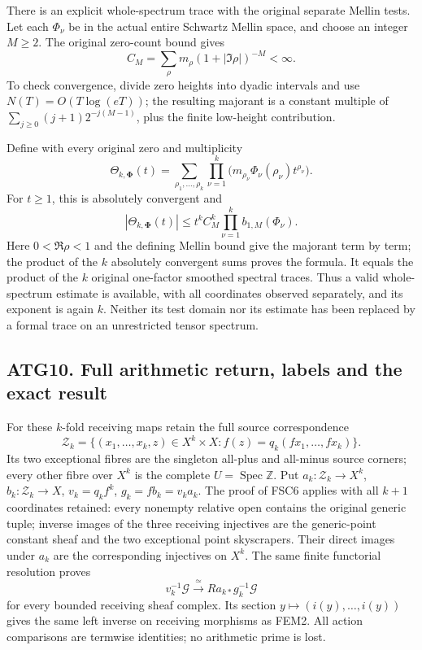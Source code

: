 There is an explicit whole-spectrum trace with the original separate
Mellin tests. Let each \(\Phi_\nu\) be in the actual entire Schwartz
Mellin space, and choose an integer \(M\ge2\). The original zero-count
bound gives \[
C_M=\sum_{\rho}m_\rho(1+|\Im\rho|)^{-M}<\infty.
\] To check convergence, divide zero heights into dyadic intervals and
use \(N(T)=O(T\log(eT))\); the resulting majorant is a constant multiple
of \(\sum_{j\ge0}(j+1)2^{-j(M-1)}\), plus the finite low-height
contribution.

Define with every original zero and multiplicity \[
\Theta_{k,\boldsymbol\Phi}(t)=
\sum_{\rho_1,\ldots,\rho_k}
 \prod_{\nu=1}^k
 \bigl(m_{\rho_\nu}\Phi_\nu(\rho_\nu)t^{\rho_\nu}\bigr).
\tag{ATG9.1}
\] For \(t\ge1\), this is absolutely convergent and \[
\boxed{|\Theta_{k,\boldsymbol\Phi}(t)|
 \le t^k C_M^k
 \prod_{\nu=1}^k b_{1,M}(\Phi_\nu).}
\tag{ATG9.2}
\] Here \(0<\Re\rho<1\) and the defining Mellin bound give the majorant
term by term; the product of the \(k\) absolutely convergent sums proves
the formula. It equals the product of the \(k\) original one-factor
smoothed spectral traces. Thus a valid whole-spectrum estimate is
available, with all coordinates observed separately, and its exponent is
again \(k\). Neither its test domain nor its estimate has been replaced
by a formal trace on an unrestricted tensor spectrum.

\subsection{ATG10. Full arithmetic return, labels and the exact
result}\label{atg10.-full-arithmetic-return-labels-and-the-exact-result}

For these \(k\)-fold receiving maps retain the full source
correspondence \[
\mathcal Z_k=
\{(x_1,\ldots,x_k,z)\in X^k\times X:
 f(z)=q_k(fx_1,\ldots,fx_k)\}.
\] Its two exceptional fibres are the singleton all-plus and all-minus
source corners; every other fibre over \(X^k\) is the complete
\(U=\operatorname{Spec}\mathbb Z\). Put \(a_k:\mathcal Z_k\to X^k\),
\(b_k:\mathcal Z_k\to X\), \(v_k=q_k f^k\), \(g_k=fb_k=v_ka_k\). The
proof of FSC6 applies with all \(k+1\) coordinates retained: every
nonempty relative open contains the original generic tuple; inverse
images of the three receiving injectives are the generic-point constant
sheaf and the two exceptional point skyscrapers. Their direct images
under \(a_k\) are the corresponding injectives on \(X^k\). The same
finite functorial resolution proves \[
v_k^{-1}\mathcal G\xrightarrow{\ \simeq\ }
Ra_{k*}g_k^{-1}\mathcal G
\tag{ATG10.1}
\] for every bounded receiving sheaf complex. Its section
\(y\mapsto(i(y),\ldots,i(y))\) gives the same left inverse on receiving
morphisms as FEM2. All action comparisons are termwise identities; no
arithmetic prime is lost.

